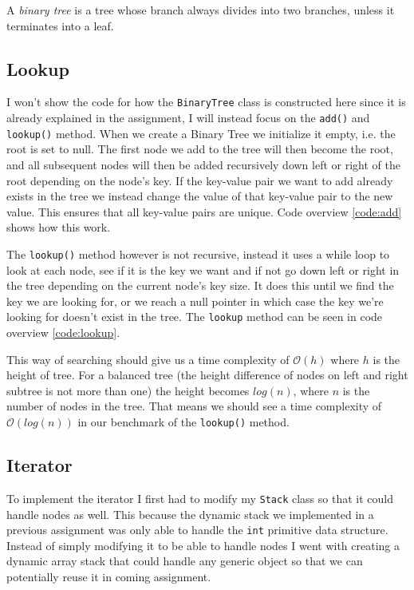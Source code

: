 \documentclass[a4paper,11pt]{article}
\begin{document}
A \textit{binary tree} is a tree whose branch always divides into two branches, unless it terminates
into a leaf.
\subsection{Lookup}

I won't show the code for how the {\tt BinaryTree} class is constructed here since it
is already explained in the assignment, I will instead focus on the {\tt add()} and
    {\tt lookup()} method. When we create a Binary Tree we initialize it empty, i.e. the
root is set to null. The first node we add to the tree will then become the root, and
all subsequent nodes will then be added recursively down left or right of the root
depending on the node's key. If the key-value pair we want to add already exists in the
tree we instead change the value of that key-value pair to the new value. This ensures
that all key-value pairs are unique. Code overview \ref{code:add} shows how this work.

The {\tt lookup()} method however is not recursive, instead it uses a while loop to look
at each node, see if it is the key we want and if not go down left or right in the tree
depending on the current node's key size. It does this until we find the key we are looking
for, or we reach a null pointer in which case the key we're looking for doesn't exist in
the tree. The {\tt lookup} method can be seen in code overview \ref{code:lookup}.

This way of searching should give us a time complexity of $\mathcal{O}(h)$ where
$h$ is the height of tree. For a balanced tree (the height difference of nodes on
left and right subtree is not more than one) the height becomes $log(n)$, where $n$ is
the number of nodes in the tree. That means we should see a time complexity of
$\mathcal{O}(log(n))$ in our benchmark of the {\tt lookup()} method.

\subsection{Iterator}
To implement the iterator I first had to modify my {\tt Stack} class so that it could
handle nodes as well. This because the dynamic stack we implemented in a previous assignment
was only able to handle the {\tt int} primitive data structure. Instead of simply modifying
it to be able to handle nodes I went with creating a dynamic array stack that could handle
any generic object so that we can potentially reuse it in coming assignment.
\end{document}
